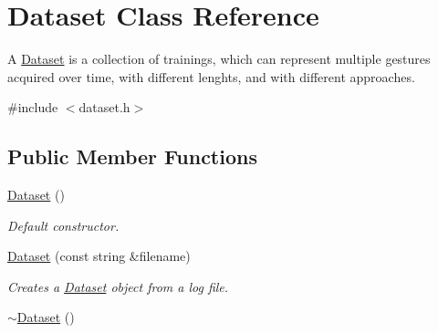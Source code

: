 \hypertarget{class_dataset}{\section{Dataset Class Reference}
\label{class_dataset}
}


A \hyperlink{class_dataset}{Dataset} is a collection of trainings, which can represent multiple gestures acquired over time, with different lenghts, and with different approaches.  




{\ttfamily \#include $<$dataset.\-h$>$}

\subsection*{Public Member Functions}
\begin{DoxyCompactItemize}
\item 
\hypertarget{class_dataset_a2ef0a4a688a218d55ef061c6df659a4a}{\hyperlink{class_dataset_a2ef0a4a688a218d55ef061c6df659a4a}{Dataset} ()}\label{class_dataset_a2ef0a4a688a218d55ef061c6df659a4a}

\begin{DoxyCompactList}\small\item\em Default constructor. \end{DoxyCompactList}\item 
\hyperlink{class_dataset_a299c3198f6325d0c627aa029ed24e2e5}{Dataset} (const string \&filename)
\begin{DoxyCompactList}\small\item\em Creates a \hyperlink{class_dataset}{Dataset} object from a log file. \end{DoxyCompactList}\item 
\hypertarget{class_dataset_a7f38b79ccbf9ada90d68d3a50250b193}{\hyperlink{class_dataset_a7f38b79ccbf9ada90d68d3a50250b193}{$\sim$\-Dataset} ()}\label{class_dataset_a7f38b79ccbf9ada90d68d3a50250b193}


\end{DoxyCompactItemize}
